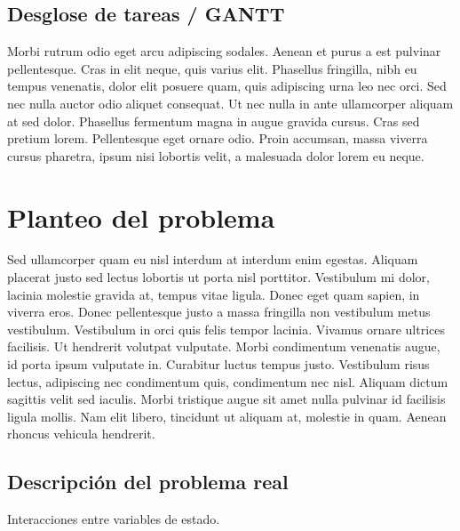 
\subsection{Desglose de tareas / GANTT}
Morbi rutrum odio eget arcu adipiscing sodales. Aenean et purus a est pulvinar pellentesque. Cras in elit neque, quis varius elit. Phasellus fringilla, nibh eu tempus venenatis, dolor elit posuere quam, quis adipiscing urna leo nec orci. Sed nec nulla auctor odio aliquet consequat. Ut nec nulla in ante ullamcorper aliquam at sed dolor. Phasellus fermentum magna in augue gravida cursus. Cras sed pretium lorem. Pellentesque eget ornare odio. Proin accumsan, massa viverra cursus pharetra, ipsum nisi lobortis velit, a malesuada dolor lorem eu neque.


\section{Planteo del problema}

Sed ullamcorper quam eu nisl interdum at interdum enim egestas. Aliquam placerat justo sed lectus lobortis ut porta nisl porttitor. Vestibulum mi dolor, lacinia molestie gravida at, tempus vitae ligula. Donec eget quam sapien, in viverra eros. Donec pellentesque justo a massa fringilla non vestibulum metus vestibulum. Vestibulum in orci quis felis tempor lacinia. Vivamus ornare ultrices facilisis. Ut hendrerit volutpat vulputate. Morbi condimentum venenatis augue, id porta ipsum vulputate in. Curabitur luctus tempus justo. Vestibulum risus lectus, adipiscing nec condimentum quis, condimentum nec nisl. Aliquam dictum sagittis velit sed iaculis. Morbi tristique augue sit amet nulla pulvinar id facilisis ligula mollis. Nam elit libero, tincidunt ut aliquam at, molestie in quam. Aenean rhoncus vehicula hendrerit.

\subsection{Descripción del problema real}

Interacciones entre variables de estado.

